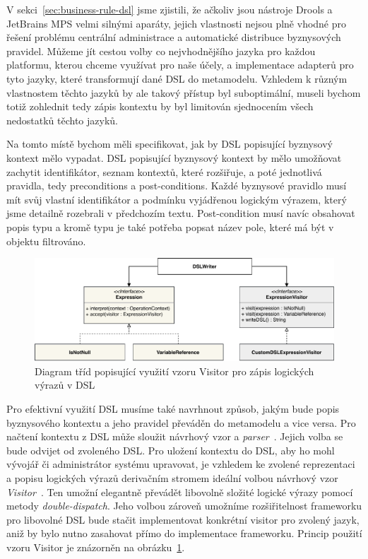 V sekci~\ref{sec:business-rule-dsl} jsme zjistili, že ačkoliv jsou nástroje Drools a JetBrains
MPS velmi silnými aparáty, jejich vlastnosti nejsou plně vhodné pro řešení problému
centrální administrace a automatické distribuce byznysových pravidel.
Můžeme jít cestou volby co nejvhodnějšího jazyka pro každou platformu, kterou chceme
využívat pro naše účely, a implementace adapterů pro tyto jazyky, které transformují
dané \gls{DSL} do metamodelu. Vzhledem k různým vlastnostem těchto jazyků by ale takový
přístup byl suboptimální, museli bychom totiž zohlednit 
\textendash\xspace tedy zápis kontextu by byl limitován sjednocením všech nedostatků těchto jazyků.

Na tomto místě bychom měli specifikovat, jak by \gls{DSL} popisující byznysový kontext mělo vypadat.
\gls{DSL} popisující byznysový kontext by mělo umožňovat zachytit identifikátor, seznam kontextů,
které rozšiřuje, a poté jednotlivá pravidla, tedy preconditions a post-conditions. Každé byznysové pravidlo musí
mít svůj vlastní identifikátor a podmínku vyjádřenou logickým výrazem, který jsme detailně rozebrali
v předchozím textu. Post-condition musí navíc obsahovat popis typu a kromě typu  je
také potřeba popsat název pole, které má být v objektu filtrováno.

\begin{figure}
    \centering
    \includegraphics[keepaspectratio=true, width=1\linewidth]{figures/expression-visitor.pdf}
    \caption{Diagram tříd popisující využití vzoru Visitor pro zápis logických výrazů v \gls{DSL}}
    \label{fig:expression-visitor}
\end{figure}

Pro efektivní využití \gls{DSL} musíme také navrhnout způsob, jakým bude
popis byznysového kontextu a jeho pravidel převáděn do metamodelu a vice versa.
Pro načtení kontextu z \gls{DSL} může sloužit
návrhový vzor a \textit{parser}~\cite{scott2000programming}. Jejich volba se bude
odvijet od zvoleného \gls{DSL}.
Pro uložení kontextu do \gls{DSL}, aby ho mohl vývojář či administrátor
systému upravovat, je vzhledem ke zvolené reprezentaci a popisu logických
výrazů derivačním stromem ideální volbou návrhový vzor \textit{Visitor}~\cite{fowler2002patterns}.
Ten umožní elegantně převádět libovolně složité logické výrazy pomocí metody
\textit{double-dispatch}. Jeho volbou zároveň umožníme rozšiřitelnost frameworku
pro libovolné \gls{DSL} \textendash\xspace bude stačit implementovat konkrétní
visitor pro zvolený jazyk, aniž by bylo nutno zasahovat přímo do implementace frameworku.
Princip použití vzoru Visitor je znázorněn na obrázku~\ref{fig:expression-visitor}.

